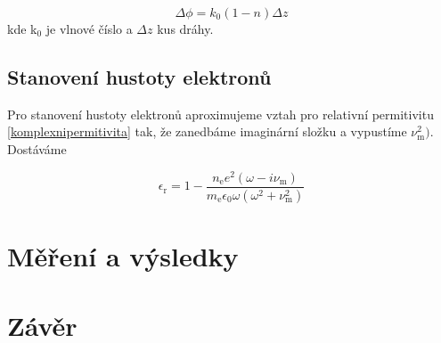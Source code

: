 \documentclass[a4paper,12pt]{article}
\begin{document}
\begin{equation}
 	\Delta\phi = k_0(1-n) \Delta z
\end{equation}
kde k$_0$ je vlnové číslo a $\Delta z$ kus dráhy.  

\subsection{Stanovení hustoty elektronů}
Pro stanovení hustoty elektronů aproximujeme vztah pro relativní permitivitu \eqref{komplexnipermitivita} tak, že zanedbáme imaginární složku a vypustíme $\nu_\text{m}^2)$. Dostáváme

\begin{equation}
	\epsilon_\text{r} = 1- \frac{n_\text{e} e^2 (\omega - i \nu_\text{m})}{m_\text{e} \epsilon_0 \omega (\omega^2 +\nu_\text{m}^2)}
	\label{permitivita}
\end{equation}



\section{Měření a výsledky}


\section{Závěr}
\end{document}
